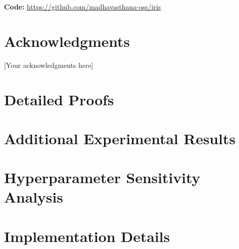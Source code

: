 \documentclass[11pt]{article}
\begin{document}
\textbf{Code:} \url{https://github.com/madhavasthana-oss/iris}

\section*{Acknowledgments}

[Your acknowledgments here]




\appendix

\section{Detailed Proofs}
\label{app:proofs}


\section{Additional Experimental Results}
\label{app:experiments}


\section{Hyperparameter Sensitivity Analysis}
\label{app:sensitivity}


\section{Implementation Details}
\label{app:implementation}

\end{document}
